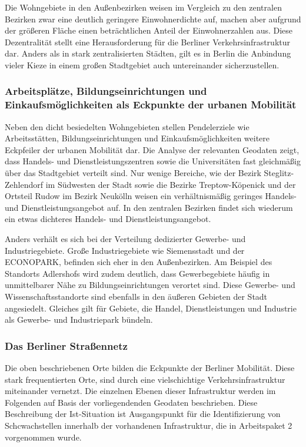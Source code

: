 Die Wohngebiete in den Außenbezirken weisen im Vergleich zu den zentralen Bezirken zwar eine deutlich geringere Einwohnerdichte auf, machen aber aufgrund der größeren Fläche einen beträchtlichen Anteil der Einwohnerzahlen aus. Diese Dezentralität stellt eine Herausforderung für die Berliner Verkehrsinfrastruktur dar. Anders als in stark zentralisierten Städten, gilt es in Berlin die Anbindung vieler Kieze in einem großen Stadtgebiet auch untereinander sicherzustellen.

\subsubsection{Arbeitsplätze, Bildungseinrichtungen und Einkaufsmöglichkeiten als Eckpunkte der urbanen Mobilität}

Neben den dicht besiedelten Wohngebieten stellen Pendelerziele wie Arbeitsstätten, Bildungseinrichtungen und Einkaufsmöglichkeiten weitere Eckpfeiler der urbanen Mobilität dar. Die Analyse der relevanten Geodaten zeigt, dass Handels- und Dienstleistungszentren sowie die Universitäten fast gleichmäßig über das Stadtgebiet verteilt sind. Nur wenige Bereiche, wie der Bezirk Steglitz-Zehlendorf im Südwesten der Stadt sowie die Bezirke Treptow-Köpenick und der Ortsteil Rudow im Bezirk Neukölln weisen ein verhältnismäßig geringes Handels- und Dienstleistungsangebot auf. In den zentralen Bezirken findet sich wiederum ein etwas dichteres Handels- und Dienstleistungsangebot.

Anders verhält es sich bei der Verteilung dedizierter Gewerbe- und Industriegebiete. Große Industriegebiete wie Siemensstadt und der ECONOPARK, befinden sich eher in den Außenbezirken. Am Beispiel des Standorts Adlershofs wird zudem deutlich, dass Gewerbegebiete häufig in unmittelbarer Nähe zu Bildungseinrichtungen verortet sind. Diese Gewerbe- und Wissenschaftsstandorte sind ebenfalls in den äußeren Gebieten der Stadt angesiedelt. Gleiches gilt für Gebiete, die Handel, Dienstleistungen und Industrie als Gewerbe- und Industriepark bündeln.



\subsubsection{Das Berliner Straßennetz}

Die oben beschriebenen Orte bilden die Eckpunkte der Berliner Mobilität. Diese stark frequentierten Orte, sind durch eine vielschichtige Verkehrsinfrastruktur miteinander vernetzt. Die einzelnen Ebenen dieser Infrastruktur werden im Folgenden auf Basis der vorliegendenden Geodaten beschrieben. Diese Beschreibung der Ist-Situation ist Ausgangspunkt für die Identifizierung von Schcwachstellen innerhalb der vorhandenen Infrastruktur, die in Arbeitspaket 2 vorgenommen wurde.


